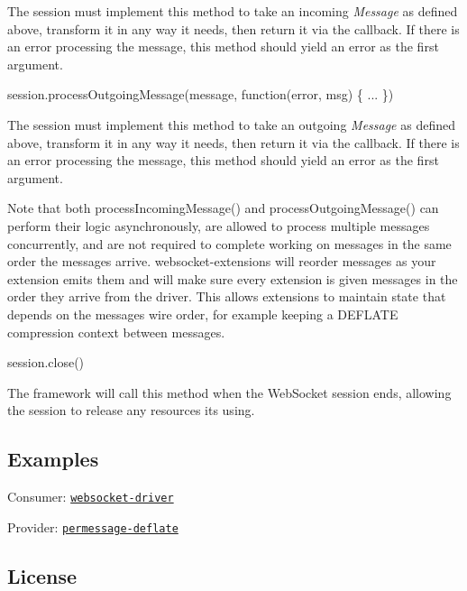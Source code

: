 The session must implement this method to take an incoming {\itshape Message} as defined above, transform it in any way it needs, then return it via the callback. If there is an error processing the message, this method should yield an error as the first argument.


\begin{DoxyCode}
session.processOutgoingMessage(message, function(error, msg) \{ ... \})
\end{DoxyCode}


The session must implement this method to take an outgoing {\itshape Message} as defined above, transform it in any way it needs, then return it via the callback. If there is an error processing the message, this method should yield an error as the first argument.

Note that both {\ttfamily process\+Incoming\+Message()} and {\ttfamily process\+Outgoing\+Message()} can perform their logic asynchronously, are allowed to process multiple messages concurrently, and are not required to complete working on messages in the same order the messages arrive. {\ttfamily websocket-\/extensions} will reorder messages as your extension emits them and will make sure every extension is given messages in the order they arrive from the driver. This allows extensions to maintain state that depends on the messages\textquotesingle{} wire order, for example keeping a D\+E\+F\+L\+A\+TE compression context between messages.


\begin{DoxyCode}
session.close()
\end{DoxyCode}


The framework will call this method when the Web\+Socket session ends, allowing the session to release any resources it\textquotesingle{}s using.

\subsection*{Examples}


\begin{DoxyItemize}
\item Consumer\+: \href{https://github.com/faye/websocket-driver-node}{\tt websocket-\/driver}
\item Provider\+: \href{https://github.com/faye/permessage-deflate-node}{\tt permessage-\/deflate}
\end{DoxyItemize}

\subsection*{License}

